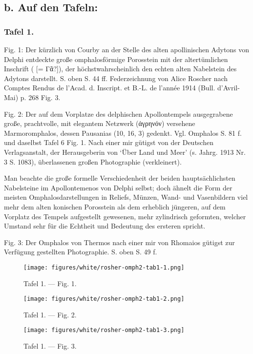 \documentclass[a4paper, 11pt, oneside]{article}
\newcommand*\svgAAA{}
\begin{document}
\subsection{b. Auf den Tafeln:}
\clearpage
\subsubsection{Tafel 1.}

Fig. 1: Der kürzlich von Courby an der Stelle des alten apollinischen Adytons von Delphi entdeckte große omphalosförmige Porosstein mit der altertümlichen Inschrift ($\svgAAA$ [= Γᾶ?]), der höchstwahrscheinlich den echten alten Nabelstein des Adytons darstellt. S. oben S. 44 ff. Federzeichnung von Alice Roscher nach Comptes Rendus de l'Acad. d. Inscript. et B.-L. de l'année 1914 (Bull. d'Avril-Mai) p. 268 Fig. 3.

Fig. 2: Der auf dem Vorplatze des delphischen Apollontempels ausgegrabene große, prachtvolle, mit elegantem Netzwerk (ἀγρηνόν) versehene Marmoromphalos, dessen Pausanias (10, 16, 3) gedenkt. Vgl. Omphalos S. 81 f. und daselbst Tafel 6 Fig. 1. Nach einer mir gütigst von der Deutschen Verlagsanstalt, der Herausgeberin von `Über Land und Meer' (s. Jahrg. 1913 Nr. 3 S. 1083), überlassenen großen Photographie (verkleinert).

Man beachte die große formelle Verschiedenheit der beiden hauptsächlichsten Nabelsteine im Apollontemenos von Delphi selbst; doch ähnelt die Form der meisten Omphalosdarstellungen in Reliefs, Münzen, Wand- und Vasenbildern viel mehr dem alten konischen Porosstein als dem erheblich jüngeren, auf dem Vorplatz des Tempels aufgestellt gewesenen, mehr zylindrisch geformten, welcher Umstand sehr für die Echtheit und Bedeutung des ersteren spricht.

Fig. 3: Der Omphalos von Thermos nach einer mir von Rhomaios gütigst zur Verfügung gestellten Photographie. S. oben S. 49 f.
\clearpage
\vspace*{\fill}
\begin{figure}[H]
\centering
\texttt{[image: figures/white/rosher-omph2-tab1-1.png]}
\caption{Tafel 1. --- Fig. 1.}
\end{figure}
\vspace*{\fill}
\clearpage
\vspace*{\fill}
\begin{figure}[H]
\centering
\texttt{[image: figures/white/rosher-omph2-tab1-2.png]}
\caption{Tafel 1. --- Fig. 2.}
\end{figure}
\vspace*{\fill}
\clearpage
\vspace*{\fill}
\begin{figure}[H]
\centering
\texttt{[image: figures/white/rosher-omph2-tab1-3.png]}
\caption{Tafel 1. --- Fig. 3.}
\end{figure}
\vspace*{\fill}
\clearpage
\end{document}
